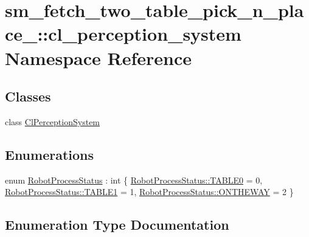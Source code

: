 \hypertarget{namespacesm__fetch__two__table__pick__n__place__1_1_1cl__perception__system}{}\section{sm\+\_\+fetch\+\_\+two\+\_\+table\+\_\+pick\+\_\+n\+\_\+place\+\_\+:\+:cl\+\_\+perception\+\_\+system Namespace Reference}
\label{namespacesm__fetch__two__table__pick__n__place__1_1_1cl__perception__system}
\subsection*{Classes}
\begin{DoxyCompactItemize}
\item 
class \hyperlink{classsm__fetch__two__table__pick__n__place__1_1_1cl__perception__system_1_1ClPerceptionSystem}{Cl\+Perception\+System}
\end{DoxyCompactItemize}
\subsection*{Enumerations}
\begin{DoxyCompactItemize}
\item 
enum \hyperlink{namespacesm__fetch__two__table__pick__n__place__1_1_1cl__perception__system_a8bbef1f1cfae124eaec70ac53eede699}{Robot\+Process\+Status} \+: int \{ \hyperlink{namespacesm__fetch__two__table__pick__n__place__1_1_1cl__perception__system_a8bbef1f1cfae124eaec70ac53eede699a1fd65c0ced0ead229bf6dd6a59067a4f}{Robot\+Process\+Status\+::\+T\+A\+B\+L\+E0} = 0, 
\hyperlink{namespacesm__fetch__two__table__pick__n__place__1_1_1cl__perception__system_a8bbef1f1cfae124eaec70ac53eede699a5b22e42e5d94a94037a4486a4976c49d}{Robot\+Process\+Status\+::\+T\+A\+B\+L\+E1} = 1, 
\hyperlink{namespacesm__fetch__two__table__pick__n__place__1_1_1cl__perception__system_a8bbef1f1cfae124eaec70ac53eede699a92f7ea3097b3fdb1b7a25669cfc1b8bd}{Robot\+Process\+Status\+::\+O\+N\+T\+H\+E\+W\+AY} = 2
 \}
\end{DoxyCompactItemize}


\subsection{Enumeration Type Documentation}
\mbox{\label{namespacesm__fetch__two__table__pick__n__place__1_1_1cl__perception__system_a8bbef1f1cfae124eaec70ac53eede699}} 
